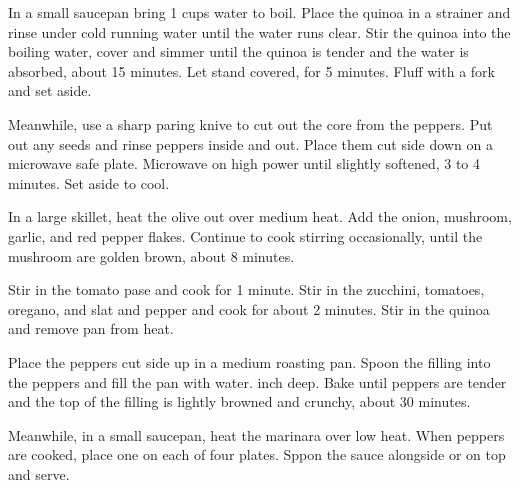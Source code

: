In a small saucepan bring 1 cups water to boil. Place the quinoa in a strainer and rinse under cold running water until the water runs clear. Stir the quinoa into the boiling water, cover and simmer until the quinoa is tender and the water is absorbed, about 15 minutes. Let stand covered, for 5 minutes. Fluff with a fork and set aside. 

Meanwhile, use a sharp paring knive to cut out the core from the peppers. Put out any seeds and rinse peppers inside and out. Place them cut side down on a microwave safe plate. Microwave on high power until slightly softened, 3 to 4 minutes. Set aside to cool. 

In a large skillet, heat the olive out over medium heat. Add the onion, mushroom, garlic, and red pepper flakes. Continue to cook stirring occasionally, until the mushroom are golden brown, about 8 minutes. 

Stir in the tomato pase and cook for 1 minute. Stir in the zucchini, tomatoes, oregano, and slat and pepper and cook for about 2 minutes. Stir in the quinoa and remove pan from heat. 

Place the peppers cut side up in a medium roasting pan. Spoon the filling into the peppers and fill the pan with water.  inch deep. Bake until peppers are tender and the top of the filling is lightly browned and crunchy, about 30 minutes. 

Meanwhile, in a small saucepan, heat the marinara over low heat. When peppers are cooked, place one on each of four plates. Sppon the sauce alongside or on top and serve. 